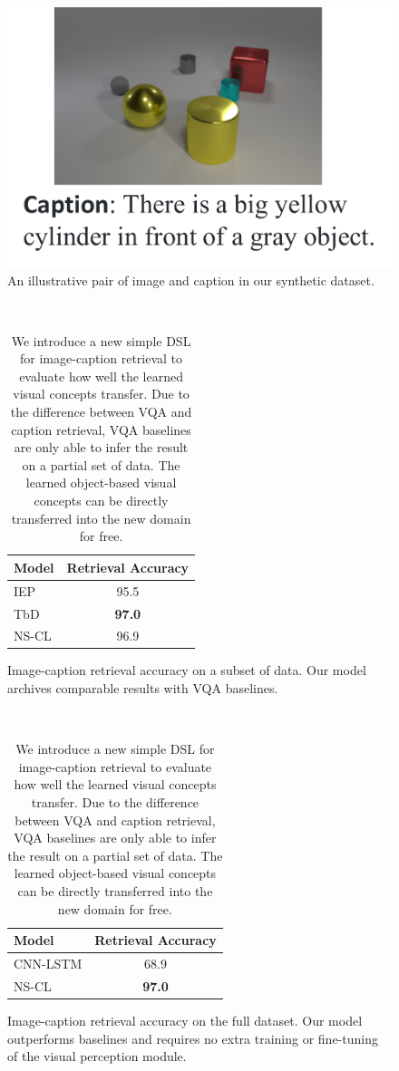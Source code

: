 \documentclass{article} %
\newcommand{\model}{NS-CL\xspace}
\begin{document}
%
\begin{table}[t]
%
    \centering\vspace{2pt}
    \begin{subfigure}[*]{0.25\textwidth}
    \includegraphics[width=\textwidth]{raw/ExampleRetrieval.pdf}
    \caption{An illustrative pair of image and caption in our synthetic dataset.}
    \end{subfigure}
    ~
    \begin{subfigure}[*]{0.33\textwidth}
        \centering\small
        \begin{tabular}{lc}
        \toprule
        Model & Retrieval Accuracy \\ \midrule
        IEP & 95.5 \\
        TbD & \textbf{97.0} \\
        \model & 96.9 \\ \bottomrule
        \end{tabular}
        \caption{Image-caption retrieval accuracy on a subset of data.  Our model archives comparable results with VQA baselines.}
        \label{tab:expr:retrieval:a}
    \end{subfigure}%
    ~ 
    \begin{subfigure}[*]{0.33\textwidth}
        \centering\small
        \begin{tabular}{lc}
        \toprule
        Model & Retrieval Accuracy \\ \midrule
        CNN-LSTM & 68.9 \\
        \model & \textbf{97.0} \\ \bottomrule
        \end{tabular}
        \caption{Image-caption retrieval accuracy on the full dataset. Our model outperforms  baselines and requires no extra training or fine-tuning of the visual perception module.}
        \label{tab:expr:retrieval:b}
    \end{subfigure}
    \caption{We introduce a new simple DSL for image-caption retrieval to evaluate how well the learned visual concepts transfer. Due to the difference between VQA and caption retrieval, VQA baselines are only able to infer the result on a partial set of data. The learned object-based visual concepts can be directly transferred into the new domain for free.}
    \label{tab:expr:retrieval}
    \vspace{-5pt}
\end{table}
\end{document}
